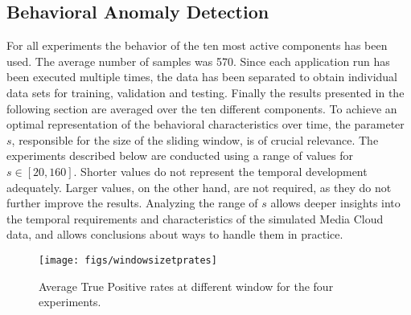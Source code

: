 \documentclass{llncs}
\begin{document}
\subsection{Behavioral Anomaly Detection}
\label{evaluationbehavioralanomalydetection}

For all experiments the behavior of the ten most active components has been used. The average number of samples was 570. Since each application run has been executed multiple times, the data has been separated to obtain individual data sets for training, validation and testing. Finally the results presented in the following section are averaged over the ten different components. To achieve an optimal representation of the behavioral characteristics over time, the parameter $s$, responsible for the size of the sliding window, is of crucial relevance. The experiments described below are conducted using a range of values for $s \in [20,160]$. Shorter values do not represent the temporal development adequately. Larger values, on the other hand, are not required, as they do not further improve the results. Analyzing the range of $s$ allows deeper insights into the temporal requirements and characteristics of the simulated Media Cloud data, and allows conclusions about ways to handle them in practice.

\begin{figure}[htb]
\vspace{-4mm}
 \centering
 \texttt{[image: figs/windowsizetprates]}
 \caption{Average True Positive rates at different window for the four experiments.}
 \label{fig:windowsizetprates}
\end{figure}
\end{document}
